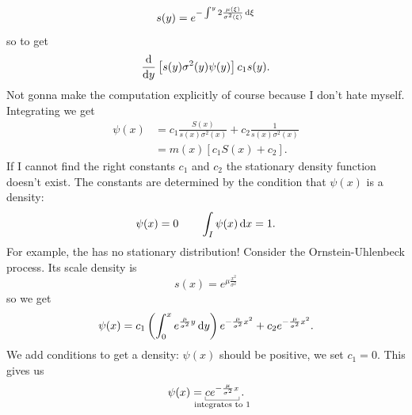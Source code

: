 \documentclass[12pt]{report}
\begin{document}
\begin{equation*}
	s(y)=e^{-\int^{y}2\frac{\mu(\xi)}{\sigma^{2}(\xi)}\mathop{}\!\mathrm{d}\xi}
\end{equation*}
so to get
\begin{equation*}
	\frac{\mathop{}\!\mathrm{d}}{\mathop{}\!\mathrm{d} y}\left[s(y)\sigma^{2}(y)\psi(y)\right]c_{1}s(y).
\end{equation*}
Not gonna make the computation explicitly of course because I don't hate myself. Integrating we get
\begin{align*}
	\psi(x)&=c_{1}\frac{S(x)}{s(x)\sigma^{2}(x)}+c_{2}\frac{1}{s(x)\sigma^{2}(x)}\\
	&=m(x)\left[c_{1}S(x)+c_{2}\right].
\end{align*}
If I cannot find the right constants $c_{1}$ and $c_{2}$ the stationary density function doesn't exist. The constants are determined by the condition that $\psi(x)$ is a density:
\begin{equation*}
	\psi(x)=0\qquad\int_{I}\psi(x)\mathop{}\!\mathrm{d} x=1.
\end{equation*}
For example, the \bwm{} has no stationary distribution! 
Consider the Ornstein-Uhlenbeck process. Its scale density is
\begin{equation*}
	s(x)=e^{\mu\frac{x^{2}}{\sigma^{2}}}
\end{equation*}
so we get
\begin{equation*}
	\psi(x)=c_{1}\left(\int_{0}^{x}e^{\frac{\mu}{\sigma^{2}}y}\mathop{}\!\mathrm{d} y\right)e^{-\frac{\mu}{\sigma^{2}}x^{2}}+c_{2}e^{-\frac{\mu}{\sigma^{2}}x^{2}}.
\end{equation*}
We add conditions to get a density: $\psi(x)$ should be positive, we set $c_{1}=0$. This gives us
\begin{equation*}
	\psi(x)=\ubracketthin{ce^{-\frac{\mu}{\sigma^{2}}x}}_{\claptext{integrates to 1}}.
\end{equation*}
\end{document}
